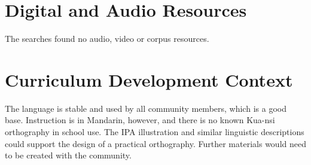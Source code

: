 \documentclass[12pt]{article}
\begin{document}
\section{Digital and Audio Resources}
The searches found no audio, video or corpus resources.

\section{Curriculum Development Context}
The language is stable and used by all community members, which is a good base. Instruction is in Mandarin, however, and there is no known Kua-nsi orthography in school use. The IPA illustration and similar linguistic descriptions could support the design of a practical orthography. Further materials would need to be created with the community.
\end{document}
